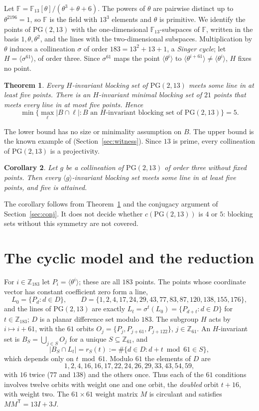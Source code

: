 \documentclass[11pt]{article}
\newtheorem{theorem}{Theorem}
\newtheorem{corollary}[theorem]{Corollary}
\theoremstyle{remark}
\newcommand{\PG}{\mathrm{PG}(2,13)}
\newcommand{\F}{\mathbb{F}}
\newcommand{\Z}{\mathbb{Z}}
\begin{document}
Let $\F=\F_{13}[\theta]/(\theta^3+\theta+6)$. The powers of $\theta$ are
pairwise distinct up to $\theta^{2196}=1$, so $\F$ is the field with $13^3$
elements and $\theta$ is primitive. We identify the points of $\PG$ with the
one-dimensional $\F_{13}$-subspaces of $\F$, written in the basis
$1,\theta,\theta^2$, and the lines with the two-dimensional subspaces.
Multiplication by $\theta$ induces a collineation $\sigma$ of order
$183=13^2+13+1$, a \emph{Singer cycle}; let $H=\langle\sigma^{61}\rangle$, of
order three. Since $\sigma^{61}$ maps the point $\langle\theta^i\rangle$ to
$\langle\theta^{i+61}\rangle\ne\langle\theta^i\rangle$, $H$ fixes no point.

\begin{theorem}\label{thm:main}
Every $H$-invariant blocking set of $\PG$ meets some line in at least five
points. There is an $H$-invariant minimal blocking set of $21$ points that
meets every line in at most five points. Hence
\[
  \min\bigl\{\max_{\ell}|B\cap\ell| : B \text{ an $H$-invariant blocking set of } \PG\bigr\}=5 .
\]
\end{theorem}

The lower bound has no size or minimality assumption on $B$. The upper bound
is the known example of \cite{BBW} (Section~\ref{sec:witness}). Since
$13$ is prime, every collineation of $\PG$ is a projectivity.

\begin{corollary}\label{cor:all}
Let $g$ be a collineation of $\PG$ of order three without fixed points. Then
every $\langle g\rangle$-invariant blocking set meets some line in at least
five points, and five is attained.
\end{corollary}

The corollary follows from Theorem~\ref{thm:main} and the conjugacy argument
of Section~\ref{sec:conj}. It does not decide whether $c(\PG)$ is $4$ or $5$:
blocking sets without this symmetry are not covered.

\section{The cyclic model and the reduction}

For $i\in\Z_{183}$ let $P_i=\langle\theta^i\rangle$; these are all $183$
points. The points whose coordinate vector has constant coefficient zero form
a line,
\[
  L_0=\{P_d : d\in D\},\qquad D=\{1,2,4,17,24,29,43,77,83,87,120,138,155,176\},
\]
and the lines of $\PG$ are exactly $L_t=\sigma^t(L_0)=\{P_{d+t}:d\in D\}$ for
$t\in\Z_{183}$; $D$ is a planar difference set modulo $183$. The subgroup $H$
acts by $i\mapsto i+61$, with the $61$ orbits $O_j=\{P_j,P_{j+61},P_{j+122}\}$,
$j\in\Z_{61}$. An $H$-invariant set is $B_S=\bigcup_{j\in S}O_j$ for a unique
$S\subseteq\Z_{61}$, and
\[
  |B_S\cap L_t| = r_S(t) := \#\{d\in D : d+t \bmod 61\in S\},
\]
which depends only on $t\bmod 61$. Modulo $61$ the elements of $D$ are
\[
  1,2,4,16,16,17,22,24,26,29,33,43,54,59,
\]
with $16$ twice ($77$ and $138$) and the others once. Thus each of the $61$
conditions involves twelve orbits with weight one and one orbit, the
\emph{doubled} orbit $t+16$, with weight two. The $61\times61$ weight matrix
$M$ is circulant and satisfies $MM^{\mathsf T}=13I+3J$.
\end{document}
